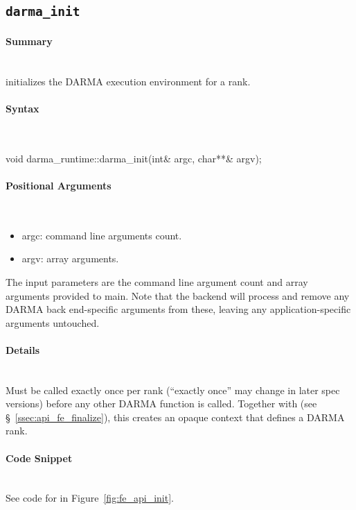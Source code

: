 
\subsection{\texttt{darma\_init}}
\label{subsec:darma_init}

\paragraph{Summary}\mbox{}\\
 initializes the DARMA execution environment for a \gls{rank}.

\paragraph{Syntax}\mbox{}\\
\begin{CppCode}
void darma_runtime::darma_init(int& argc, char**& argv);
\end{CppCode}

\paragraph{Positional Arguments}\mbox{}\\
\begin{itemize}
\item argc: command line arguments count.
\item argv: array arguments.
\end{itemize}
The input parameters are the command line argument count 
and array arguments provided to main.  
Note that the backend will process and remove 
any DARMA \gls{back end}-specific arguments from these, leaving any
application-specific arguments untouched.


\paragraph{Details}\mbox{}\\
Must be called exactly once per \gls{rank} (``exactly once'' may change in later
spec versions) before any other DARMA function is called.
Together with  (see \S~\ref{ssec:api_fe_finalize}),
this creates an \gls{opaque context} that defines a DARMA \gls{rank}.

\paragraph{Code Snippet}\mbox{}\\ 
See code for  in Figure~\ref{fig:fe_api_init}.

